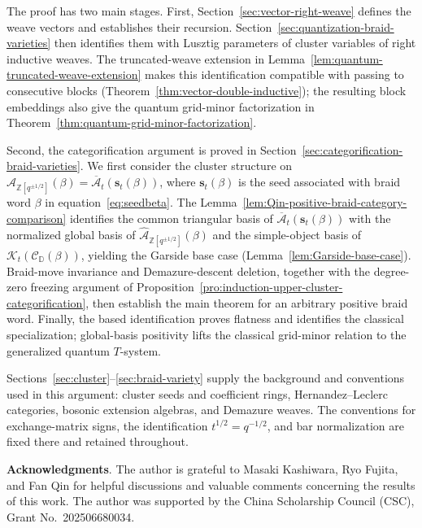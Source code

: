 \documentclass[12pt, reqno]{amsart}
\theoremstyle{plain}
\theoremstyle{definition}
\numberwithin{equation}{section}
\newcommand{\ZZ}{\mathbb{Z}}
\newcommand{\DD}{\mathbb{D}}
\newcommand{\cA}{\mathcal{A}}
\begin{document}
The proof has two main stages. First,
Section~\ref{sec:vector-right-weave} defines the weave vectors and
establishes their recursion. Section~\ref{sec:quantization-braid-varieties}
then identifies them with Lusztig parameters of cluster variables of right inductive weaves. The truncated-weave
extension in Lemma~\ref{lem:quantum-truncated-weave-extension} makes
this identification compatible with passing to consecutive blocks
(Theorem~\ref{thm:vector-double-inductive}); the resulting block
embeddings also give the quantum grid-minor factorization in
Theorem~\ref{thm:quantum-grid-minor-factorization}.

Second, the categorification argument is proved in
Section~\ref{sec:categorification-braid-varieties}.
We first consider the cluster structure on $\widehat{\cA}_{\ZZ[q^{\pm1/2}]}(\beta)=\overline{\cA}_t(\mathbf{s}_t(\beta))$, where $\mathbf{s}_t(\beta)$ is the seed associated with braid word $\beta$ in equation~\eqref{eq:seedbeta}. The  Lemma~\ref{lem:Qin-positive-braid-category-comparison}
identifies the common triangular basis of $\overline{\cA}_t(\mathbf{s}_t(\beta))$  with the normalized global
basis of $\widehat{\cA}_{\ZZ[q^{\pm1/2}]}(\beta)$ and the simple-object basis of $\mathcal{K}_t(\mathscr C_\DD(\beta))$, yielding the Garside base case
(Lemma~\ref{lem:Garside-base-case}). Braid-move invariance and
Demazure-descent deletion, together with the degree-zero freezing
argument of Proposition~\ref{pro:induction-upper-cluster-categorification},
then establish the main theorem for an arbitrary positive braid word.
Finally, the based identification proves flatness and identifies
the classical specialization; global-basis positivity lifts the
classical grid-minor relation to the generalized quantum \(T\)-system.

Sections~\ref{sec:cluster}--\ref{sec:braid-variety} supply the
background and conventions used in this argument: cluster seeds and
coefficient rings, Hernandez--Leclerc categories, bosonic extension
algebras, and Demazure weaves. The conventions for exchange-matrix
signs, the identification \(t^{1/2}=q^{-1/2}\), and bar normalization
are fixed there and retained throughout.

\noindent
\textbf{Acknowledgments}.
The author is grateful to Masaki Kashiwara, Ryo Fujita, and Fan Qin for helpful discussions and valuable comments concerning the results of this work. The author was supported by the China Scholarship Council (CSC), Grant No.~202506680034.
\end{document}
